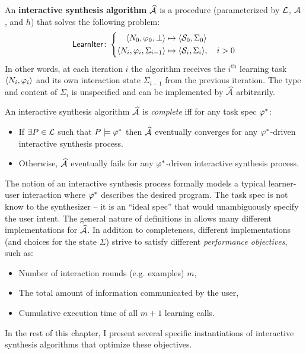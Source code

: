 \begin{problem}
    An \textbf{interactive synthesis algorithm} $\widehat{\mathcal{A}}$ is a procedure (parameterized by $\mathcal{L}$, $\mathcal{A}$, and $h$)
    that solves the following problem:
    \[
        \mathsf{LearnIter}\colon \left\{
        \begin{aligned}
            \langle N_0, \varphi_0, \bot\rangle &\mapsto \langle \mathcal{S}_0, \Sigma_0\rangle \\
            \langle N_i, \varphi_i, \Sigma_{i-1} \rangle &\mapsto \langle \mathcal{S}_i, \Sigma_i\rangle, \quad i > 0
        \end{aligned}
        \right.
    \]
    In other words, at each iteration $i$ the algorithm receives the $i^{\text{th}}$ learning task $\langle N_i, \varphi_i\rangle$ and its own
    interaction state $\Sigma_{i-1}$ from the previous iteration.
    The type and content of $\Sigma_i$ is unspecified and can be implemented by $\widehat{\mathcal{A}}$ arbitrarily.
    \label{problem:interactive}
\end{problem}

\begin{defn}
    An interactive synthesis algorithm $\widehat{\mathcal{A}}$ is \emph{complete} iff for any task spec $\varphi^{*}$:
    \begin{itemize}[nosep]
        \item If $\exists P \in \mathcal{L}$ such that $P \models \varphi^{*}$ then $\widehat{\mathcal{A}}$ eventually
            converges for any $\varphi^{*}$-driven interactive synthesis process.
        \item Otherwise, $\widehat{\mathcal{A}}$ eventually fails for any $\varphi^{*}$-driven interactive synthesis
            process.
    \end{itemize}
\end{defn}

The notion of an interactive synthesis process formally models a typical learner-user interaction where $\varphi^{*}$
describes the desired program.
The task spec is not know to the synthesizer -- it is an ``ideal spec'' that would unambiguously specify the user
intent.
The general nature of definitions in  allows many different implementations for
$\widehat{\mathcal{A}}$.
In addition to completeness, different implementations (and choices for the state $\Sigma$) strive to satisfy different
\emph{performance objectives}, such as:
\begin{itemize}[nosep]
    \item Number of interaction rounds (e.g. examples) $m$,
    \item The total amount of information communicated by the user,
    \item Cumulative execution time of all $m+1$ learning calls.
\end{itemize}
In the rest of this chapter, I present several specific instantiations of interactive synthesis algorithms that
optimize these objectives.
